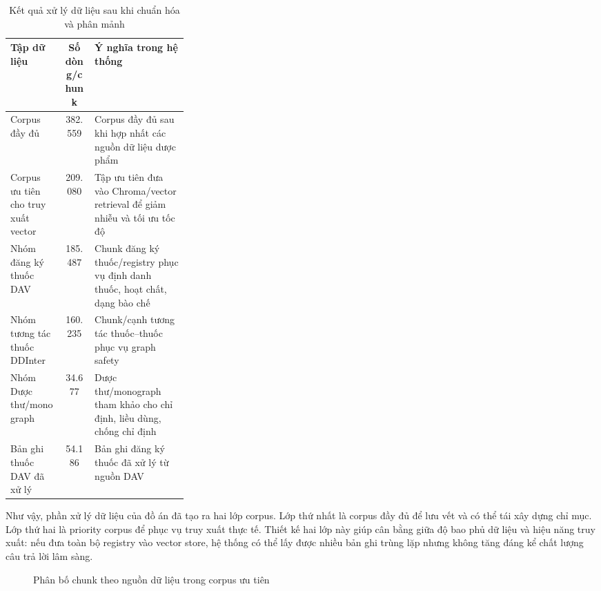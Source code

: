 \begin{table}[H]
\centering
\footnotesize
\caption{Kết quả xử lý dữ liệu sau khi chuẩn hóa và phân mảnh}
\begin{tabularx}{\linewidth}{p{0.30\linewidth} C Y}
\toprule
\textbf{Tập dữ liệu} & \textbf{Số dòng/chunk} & \textbf{Ý nghĩa trong hệ thống} \\
\midrule
Corpus đầy đủ & 382.559 & Corpus đầy đủ sau khi hợp nhất các nguồn dữ liệu dược phẩm \\
Corpus ưu tiên cho truy xuất vector & 209.080 & Tập ưu tiên đưa vào Chroma/vector retrieval để giảm nhiễu và tối ưu tốc độ \\
Nhóm đăng ký thuốc DAV & 185.487 & Chunk đăng ký thuốc/registry phục vụ định danh thuốc, hoạt chất, dạng bào chế \\
Nhóm tương tác thuốc DDInter & 160.235 & Chunk/cạnh tương tác thuốc--thuốc phục vụ graph safety \\
Nhóm Dược thư/monograph & 34.677 & Dược thư/monograph tham khảo cho chỉ định, liều dùng, chống chỉ định \\
Bản ghi thuốc DAV đã xử lý & 54.186 & Bản ghi đăng ký thuốc đã xử lý từ nguồn DAV \\
\bottomrule
\end{tabularx}
\end{table}

Như vậy, phần xử lý dữ liệu của đồ án đã tạo ra hai lớp corpus. Lớp thứ nhất là corpus đầy đủ để lưu vết và có thể tái xây dựng chỉ mục. Lớp thứ hai là priority corpus để phục vụ truy xuất thực tế. Thiết kế hai lớp này giúp cân bằng giữa độ bao phủ dữ liệu và hiệu năng truy xuất: nếu đưa toàn bộ registry vào vector store, hệ thống có thể lấy được nhiều bản ghi trùng lặp nhưng không tăng đáng kể chất lượng câu trả lời lâm sàng.

\begin{figure}[H]
\centering
{}
\caption{Phân bố chunk theo nguồn dữ liệu trong corpus ưu tiên}
\end{figure}

